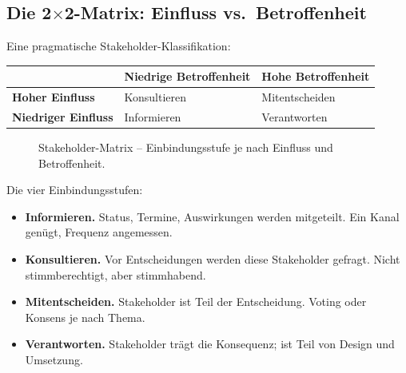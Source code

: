 \documentclass[11pt,a4paper,oneside]{article}
\newcommand{\fachbegriff}[1]{\textbf{#1}}
\begin{document}
\subsection{Die 2$\times$2-Matrix: Einfluss vs.\ Betroffenheit}

Eine pragmatische Stakeholder-Klassifikation:

\begin{tabularx}{\linewidth}{@{}l XX@{}}
\toprule
& \textbf{Niedrige Betroffenheit} & \textbf{Hohe Betroffenheit} \\
\midrule
\textbf{Hoher Einfluss} & Konsultieren & Mitentscheiden \\
\textbf{Niedriger Einfluss} & Informieren & Verantworten \\
\bottomrule
\end{tabularx}

\medskip

\begin{figure}[h]
\centering
{}
\caption{\sffamily Stakeholder-Matrix -- Einbindungsstufe je nach Einfluss und Betroffenheit.}
\end{figure}

Die vier Einbindungsstufen:

\begin{itemize}
  \item \fachbegriff{Informieren.} Status, Termine, Auswirkungen werden mitgeteilt. Ein Kanal genügt, Frequenz angemessen.
  \item \fachbegriff{Konsultieren.} Vor Entscheidungen werden diese Stakeholder gefragt. Nicht stimmberechtigt, aber stimmhabend.
  \item \fachbegriff{Mitentscheiden.} Stakeholder ist Teil der Entscheidung. Voting oder Konsens je nach Thema.
  \item \fachbegriff{Verantworten.} Stakeholder trägt die Konsequenz; ist Teil von Design und Umsetzung.
\end{itemize}
\end{document}
